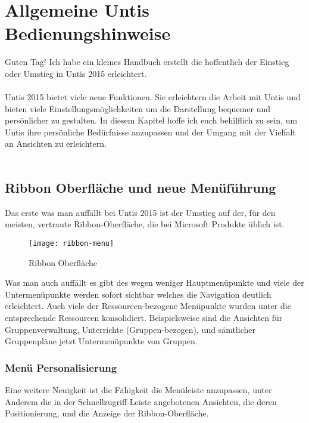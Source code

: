 
\chapter{Allgemeine Untis Bedienungshinweise}

Guten Tag! Ich habe ein kleines Handbuch erstellt die hoffentlich der Einstieg oder Umstieg in Untis 2015 erleichtert.\\
\\
Untis 2015 bietet viele neue Funktionen. Sie erleichtern die Arbeit mit Untis und bieten viele Einstellungsmöglichkeiten um die Darstellung bequemer und persönlicher zu gestalten. In diesem Kapitel hoffe ich euch behilflich zu sein, um Untis ihre persönliche Bedürfnisse anzupassen und der Umgang mit der Vielfalt an Ansichten zu erleichtern.\\
\\

\section{Ribbon Oberfläche und neue Menüführung}

Das erste was man auffällt bei Untis 2015 ist der Umstieg auf der, für den meisten, vertraute Ribbon-Oberfläche, die bei Microsoft Produkte üblich ist.

\begin{figure}[h]
	\texttt{[image: ribbon-menu]}
	\vspace{-15pt}
	\caption{Ribbon Oberfläche}
	\label{fig:ribbon}
\end{figure}

\noindent
Was man auch auffällt es gibt des wegen weniger Hauptmenüpunkte und viele der Untermenüpunkte werden sofort sichtbar welches die Navigation deutlich erleichtert. Auch viele der Ressourcen-bezogene Menüpunkte wurden unter die entsprechende Ressourcen konsolidiert. Beispielsweise sind die Ansichten für Gruppenverwaltung, Unterrichte (Gruppen-bezogen), und sämtlicher Gruppenpläne jetzt Untermenüpunkte von Gruppen.

\subsection{Menü Personalisierung}

Eine weitere Neuigkeit ist die Fähigkeit die Menüleiste anzupassen, unter Anderem die in der Schnellzugriff-Leiste angebotenen Ansichten, die deren Positionierung, und die Anzeige der Ribbon-Oberfläche.\\

